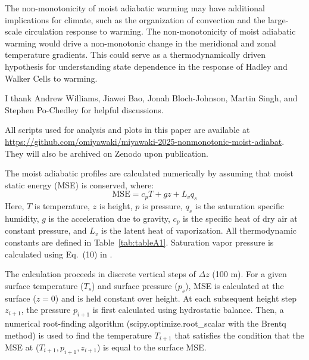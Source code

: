 \documentclass[draft]{ametsocV6.1}
\begin{document}
The non-monotonicity of moist adiabatic warming may have additional implications for climate, such as the organization of convection and the large-scale circulation response to warming. The non-monotonicity of moist adiabatic warming would drive a non-monotonic change in the meridional and zonal temperature gradients. This could serve as a thermodynamically driven hypothesis for understanding state dependence in the response of Hadley and Walker Cells to warming.

\acknowledgments
I thank Andrew Williams, Jiawei Bao, Jonah Bloch-Johnson, Martin Singh, and Stephen Po-Chedley for helpful discussions.

% 
%
\datastatement
All scripts used for analysis and plots in this paper are available at \url{https://github.com/omiyawaki/miyawaki-2025-nonmonotonic-moist-adiabat}. They will also be archived on Zenodo upon publication.



\appendix[A] 


The moist adiabatic profiles are calculated numerically by assuming that moist static energy (MSE) is conserved, where:
\begin{equation}
\text{MSE}=c_p T+gz+L_v q_s \label{eq:mse_appendix}
\end{equation}
Here, $T$ is temperature, $z$ is height, $p$ is pressure, $q_s$ is the saturation specific humidity, $g$ is the acceleration due to gravity, $c_p$ is the specific heat of dry air at constant pressure, and $L_v$ is the latent heat of vaporization. All thermodynamic constants are defined in Table~\ref{tab:tableA1}. Saturation vapor pressure is calculated using Eq.~(10) in \cite{bolton1980}.

The calculation proceeds in discrete vertical steps of $\Delta z$ (100 m). For a given surface temperature ($T_s$) and surface pressure ($p_s$), MSE is calculated at the surface ($z=0$) and is held constant over height. At each subsequent height step $z_{i+1}$, the pressure $p_{i+1}$ is first calculated using hydrostatic balance. Then, a numerical root-finding algorithm (scipy.optimize.root\_scalar with the Brentq method) is used to find the temperature $T_{i+1}$ that satisfies the condition that the MSE at ($T_{i+1}, p_{i+1}, z_{i+1}$) is equal to the surface MSE.
\end{document}
